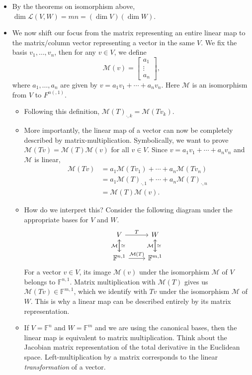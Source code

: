 \documentclass{article}
\newcommand{\F}{\mathbb{F}}
\renewcommand{\d}{\dim}
\newcommand{\LVW}{\mathcal{L}(V,W)}
\newcommand{\M}{\mathcal{M}}
\newcommand{\bv}{v_1,\dots,v_n}
\begin{document}
\begin{itemize}
    \item By the theorems on isomorphism above, $\d \LVW = mn = (\d V) (\d W)$.
    \item We now shift our focus from the matrix representing an entire linear map to the matrix/column vector representing a vector in the same $V$. We fix the basis $\bv$, then for any $v \in V$, we define
    \begin{equation*}
        \M(v) = 
        \begin{bmatrix}
            a_1 \\ \vdots \\ a_n
        \end{bmatrix},
    \end{equation*}
    where $a_1,\dots,a_n$ are given by $v = a_1v_1+\cdots+a_nv_n$. Here $\M$ is an isomorphism from $V$ to $F^{n(, 1)}$.
    \begin{itemize}
        \item Following this definition, $\M(T)_{\cdot,k} = \M(Tv_k)$.
        \item More importantly, the linear map of a vector can now be completely described by matrix-multiplication. Symbolically, we want to prove $\M(Tv) = \M(T)\M(v)$ for all $v \in V$. Since $v = a_1v_1 + \cdots +a_nv_n$ and $\M$ is linear,
        \begin{align*}
            \M(Tv) & = a_1\M(Tv_1) + \cdots + a_n \M(Tv_n) \\ & = a_1\M(T)_{\cdot, 1} + \cdots + a_n\M(T)_{\cdot, n} \\ & = \M(T)\M(v).
        \end{align*}
        \item How do we interpret this? Consider the following diagram under the appropriate bases for $V$ and $W$.
        \begin{equation*}
            \begin{tikzcd}
            V \arrow[r,"T"] \arrow[d,"\simeq"]& W \arrow[d,"\simeq"] \\
            \F^{n,1} \arrow[r,"\M(T)"] \arrow[u,"\M"] & \F^{m,1} \arrow[u,"\M"]
            \end{tikzcd}
        \end{equation*}
        For a vector $v \in V$, its image $\M(v)$ under the isomorphism $\M$ of $V$ belongs to $\F^{n,1}$. Matrix multiplication with $\M(T)$ gives us $\M(Tv) \in \F^{m,1}$, which we identify with $Tv$ under the isomorphism $\M$ of $W$. This is why a linear map can be described entirely by its matrix representation.
        \item If $V = \F^n$ and $W = \F^m$ and we are using the canonical bases, then the linear map is equivalent to matrix multiplication. Think about the Jacobian matrix representation of the total derivative in the Euclidean space. Left-multiplication by a matrix corresponds to the linear \textit{transformation} of a vector.

\end{itemize}
\end{itemize}
\end{document}

